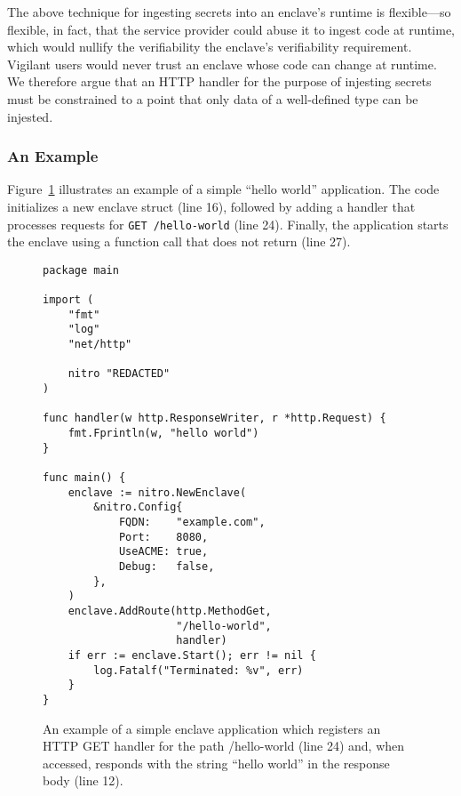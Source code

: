 The above technique for ingesting secrets into an enclave's runtime is
flexible---so flexible, in fact, that the service provider could abuse it to
ingest code at runtime, which would nullify the verifiability the enclave's
verifiability requirement.  Vigilant users would never trust an enclave whose
code can change at runtime.  We therefore argue that an HTTP handler for the
purpose of injesting secrets must be constrained to a point that only data of a
well-defined type can be injested.

\subsubsection{An Example}

Figure~\ref{fig:hello-world} illustrates an example of a simple ``hello world''
application.  The code initializes a new enclave struct (line 16), followed by
adding a handler that processes requests for \texttt{GET /hello-world} (line
24).  Finally, the application starts the enclave using a function call that
does not return (line 27).

\begin{figure}[t]
\begin{lstlisting}
package main

import (
    "fmt"
    "log"
    "net/http"

    nitro "REDACTED"
)

func handler(w http.ResponseWriter, r *http.Request) {
    fmt.Fprintln(w, "hello world")
}

func main() {
    enclave := nitro.NewEnclave(
        &nitro.Config{
            FQDN:    "example.com",
            Port:    8080,
            UseACME: true,
            Debug:   false,
        },
    )
    enclave.AddRoute(http.MethodGet,
                     "/hello-world",
                     handler)
    if err := enclave.Start(); err != nil {
        log.Fatalf("Terminated: %v", err)
    }
}
\end{lstlisting}
\caption{An example of a simple enclave application which registers an HTTP GET
  handler for the path /hello-world (line 24) and, when accessed, responds with
  the string ``hello world'' in the response body (line 12).}
\label{fig:hello-world}
\end{figure}
